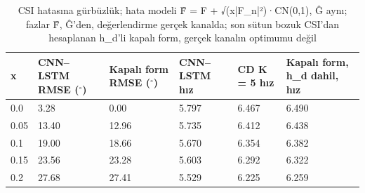 \begin{table}[t]
\centering
\caption{CSI hatasına gürbüzlük; hata modeli F̂ = F + √(x|F\_n|²)·CN(0,1), Ĝ aynı; fazlar F̂, Ĝ'den, değerlendirme gerçek kanalda; son sütun bozuk CSI'dan hesaplanan h\_d'li kapalı form, gerçek kanalın optimumu değil}
\begin{tabular}{llllll}
\toprule
x & CNN–LSTM RMSE ($^\circ$) & Kapalı form RMSE ($^\circ$) & CNN–LSTM hız & CD K = 5 hız & Kapalı form, h\_d dahil, hız \\
\midrule
0.0 & 3.28 & 0.00 & 5.797 & 6.467 & 6.490 \\
0.05 & 13.40 & 12.96 & 5.735 & 6.412 & 6.438 \\
0.1 & 19.00 & 18.66 & 5.670 & 6.354 & 6.382 \\
0.15 & 23.56 & 23.28 & 5.603 & 6.292 & 6.322 \\
0.2 & 27.68 & 27.41 & 5.529 & 6.225 & 6.259 \\
\bottomrule
\end{tabular}
\end{table}
